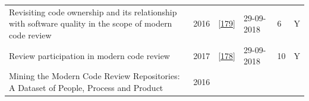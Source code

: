 \documentclass[]{book}
\begin{document}
\begin{longtable}[]{@{}llllll@{}}
\begin{minipage}[t]{0.47\columnwidth}
Revisiting code ownership and its relationship with software quality in
the scope of modern code review\strut
\end{minipage} & \begin{minipage}[t]{0.03\columnwidth}\raggedright\strut
2016\strut
\end{minipage} & \begin{minipage}[t]{0.13\columnwidth}\raggedright\strut
{[}\protect\hyperlink{ref-thongtanunam2016revisiting}{179}{]}\strut
\end{minipage} & \begin{minipage}[t]{0.06\columnwidth}\raggedright\strut
29-09-2018\strut
\end{minipage} & \begin{minipage}[t]{0.07\columnwidth}\raggedright\strut
6\strut
\end{minipage} & \begin{minipage}[t]{0.08\columnwidth}\raggedright\strut
Y\strut
\end{minipage}\tabularnewline
\begin{minipage}[t]{0.47\columnwidth}\raggedright\strut
Review participation in modern code review\strut
\end{minipage} & \begin{minipage}[t]{0.03\columnwidth}\raggedright\strut
2017\strut
\end{minipage} & \begin{minipage}[t]{0.13\columnwidth}\raggedright\strut
{[}\protect\hyperlink{ref-thongtanunam2017review}{178}{]}\strut
\end{minipage} & \begin{minipage}[t]{0.06\columnwidth}\raggedright\strut
29-09-2018\strut
\end{minipage} & \begin{minipage}[t]{0.07\columnwidth}\raggedright\strut
10\strut
\end{minipage} & \begin{minipage}[t]{0.08\columnwidth}\raggedright\strut
Y\strut
\end{minipage}\tabularnewline
\begin{minipage}[t]{0.47\columnwidth}\raggedright\strut
Mining the Modern Code Review Repositories: A Dataset of People, Process
and Product\strut
\end{minipage} & \begin{minipage}[t]{0.03\columnwidth}\raggedright\strut
2016\strut
\end{minipage} & \begin{minipage}[t]{0.13\columnwidth}\raggedright\strut

\end{minipage}
\end{longtable}
\end{document}
